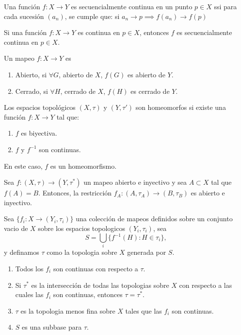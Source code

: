 \begin{definicion}
    Una función $f:X\to Y$ es secuencialmente continua en un punto $p\in X$ ssi para cada sucesión $(a_n)$, se cumple que: si $a_n\to p\implies f(a_n)\to f(p)$
    
\end{definicion}

\begin{teorema}
    Si una función $f:X\to Y$ es continua en $p\in X$, entonces $f$ es secuencialmente continua en $p\in X$. 
\end{teorema}


\begin{definicion}
    Un mapeo $f:X\to Y$ es 
    \begin{enumerate}
        \item Abierto, si $\forall G$, abierto de $X$, $f(G)$ es abierto de $Y$. 
        \item Cerrado, si $\forall H$, cerrado de $X$, $f(H)$ es cerrado de $Y$. 
    \end{enumerate}
\end{definicion}

\begin{definicion}
    Los espacios topológicos $(X,\tau)$ y $(Y,\tau')$ son homeomorfos si existe una función $f:X\to Y$ tal que: 
    \begin{enumerate}
        \item $f$ es biyectiva. 
        \item $f$ y $f^{-1}$ son continuas.
    \end{enumerate}
    En este caso, $f$ es un homeomorfismo. 
\end{definicion}


\begin{prop}
    Sea $f:(X,\tau)\to (Y,\tau^*)$ un mapeo abierto e inyectivo y sea $A\subset X$ tal que $f(A)=B$. Entonces, la restricción $f_A:(A,\tau_A)\to (B,\tau_B)$
    es abierto e inyectivo. 
\end{prop}


\begin{teorema}
    Sea $\{f_i:X\to (Y_i,\tau_i)\}$ una colección de mapeos definidos sobre un conjunto vacio de $X$ sobre los espacios topologicos $(Y_i,\tau_i)$, sea 
    $$S=\bigcup_i \{f^{-1}(H):H\in \tau_i\},$$
    y definamos $\tau$ como la topologia sobre $X$ generada por $S$. 
    \begin{enumerate}
        \item Todos los $f_i$ son continuas con respecto a $\tau$. 
        \item Si $\tau^*$ es la intersección de todas las topologias sobre $X$ con respecto a las cuales las $f_i$ son continuas, entonces $\tau=\tau^*$. 
        \item $\tau$ es la topologia menos fina sobre $X$ tales que las $f_i$ son continuas. 
        \item $S$ es una subbase para $\tau$. 
    \end{enumerate}
\end{teorema}


